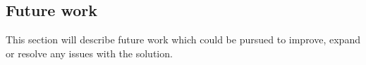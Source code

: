 \subsection{Future work}
\label{sec:future_work}

This section will describe future work which could be pursued to improve, expand or resolve any issues with the solution.

